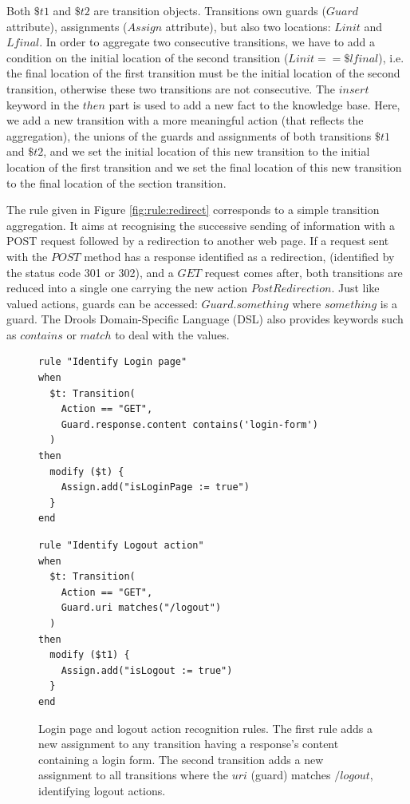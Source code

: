 \begin{itemize}
Both $\$t1$ and $\$t2$ are transition objects. Transitions own
guards ($Guard$ attribute), assignments ($Assign$ attribute), but
also two locations: $Linit$ and $Lfinal$. In order to aggregate
two consecutive transitions, we have to add a condition on the
initial location of the second transition ($Linit == \$lfinal$),
i.e. the final location of the first transition must be the
initial location of the second transition, otherwise these two
transitions are not consecutive. The $insert$ keyword in the
$then$ part is used to add a new fact to the knowledge base.
Here, we add a new transition with a more meaningful action (that
reflects the aggregation), the unions of the guards and
assignments of both transitions $\$t1$ and $\$t2$, and we set the
initial location of this new transition to the initial location
of the first transition and we set the final location of this new
transition to the final location of the section transition.

The rule given in Figure \ref{fig:rule:redirect} corresponds to a
simple transition aggregation. It aims at recognising the
successive sending of information with a POST request followed by
a redirection to another web page.  If a request sent with the
$POST$ method has a response identified as a redirection,
(identified by the status code 301 or 302), and  a $GET$ request
comes after, both transitions are reduced into a single one
carrying the new action $PostRedirection$. Just like valued
actions, guards can be accessed: $Guard.something$ where
$something$ is a guard. The Drools Domain-Specific Language (DSL)
also provides keywords such as $contains$ or $match$ to deal with
the values.
\end{itemize}

\begin{figure}[h]
\begin{framed}
\begin{BVerbatim}
rule "Identify Login page"
when
  $t: Transition(
    Action == "GET",
    Guard.response.content contains('login-form')
  )
then
  modify ($t) {
    Assign.add("isLoginPage := true")
  }
end
\end{BVerbatim}
\end{framed}

\begin{framed}
\begin{BVerbatim}
rule "Identify Logout action"
when
  $t: Transition(
    Action == "GET",
    Guard.uri matches("/logout")
  )
then
  modify ($t1) {
    Assign.add("isLogout := true")
  }
end
\end{BVerbatim}
\end{framed}

    \caption{Login page and logout action recognition rules. The
    first rule adds a new assignment to any transition having a
    response's content containing a login form. The second
    transition adds a new assignment to all transitions where
    the $uri$ (guard) matches $/logout$, identifying logout
    actions.}
    \label{fig:rule:login}
\end{figure}

